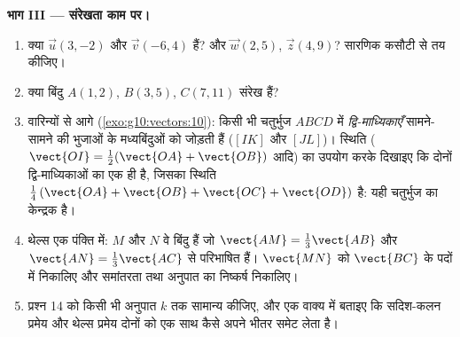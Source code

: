 \begin{problem}
\medskip
\noindent\textbf{भाग III --- संरेखता काम पर।}
\begin{enumerate}[resume]
  \item क्या $\vec u(3, -2)$ और $\vec v(-6, 4)$  हैं? और $\vec w(2, 5)$, $\vec z(4, 9)$? सारणिक कसौटी से
        तय कीजिए।
  \item क्या बिंदु $A(1, 2)$, $B(3, 5)$, $C(7, 11)$ संरेख हैं?
  \item वारिन्यों से आगे (\cref{exo:g10:vectors:10}): किसी भी चतुर्भुज $ABCD$ में
        \emph{द्वि-माध्यिकाएँ} सामने-सामने की भुजाओं के मध्यबिंदुओं को
        जोड़ती हैं ($[IK]$ और $[JL]$)। स्थिति  ($\vect{OI} = \frac12(\vect{OA} +
        \vect{OB})$ आदि) का उपयोग
        करके दिखाइए कि दोनों द्वि-माध्यिकाओं का  एक ही है, जिसका
        स्थिति  $\frac14\left(\vect{OA} + \vect{OB} + \vect{OC} +
        \vect{OD}\right)$ है: यही चतुर्भुज का केन्द्रक है।
  \item थेल्स एक पंक्ति में: $M$ और $N$ वे बिंदु हैं जो $\vect{AM} = \frac13\vect{AB}$ और $\vect{AN} = \frac13\vect{AC}$
        से परिभाषित हैं। $\vect{MN}$ को $\vect{BC}$ के पदों में निकालिए और समांतरता
        तथा अनुपात का निष्कर्ष निकालिए।
  \item प्रश्न 14 को किसी भी अनुपात $k$ तक सामान्य कीजिए, और एक वाक्य में
        बताइए कि सदिश-कलन  प्रमेय और थेल्स प्रमेय दोनों को एक साथ
        कैसे अपने भीतर समेट लेता है।
\end{enumerate}


\end{problem}
